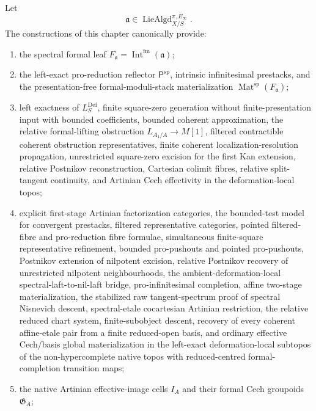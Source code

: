 \begin{theorem}
\label{thm:bnli-package}
Let
\[
    \mathfrak a
    \in
    \operatorname{LieAlgd}^{\pi,E_\infty}_{X/S}.
\]
The constructions of this chapter canonically provide:
\begin{enumerate}
    \item the spectral formal leaf
    $F_{\mathfrak a}=\operatorname{Int}^{\mathrm{fm}}(\mathfrak a)$;
    \item the left-exact pro-reduction reflector
    $\mathsf P^{\mathrm{sp}}$, intrinsic infinitesimal prestacks, and the
    presentation-free formal-moduli-stack materialization
    $\operatorname{Mat}^{\mathrm{sp}}(F_{\mathfrak a})$;
    \item left exactness of $L_S^{\mathrm{Def}}$, finite square-zero
    generation without finite-presentation input with bounded coefficients,
    bounded coherent approximation, the relative formal-lifting obstruction
    $L_{A_1/A}\to M[1]$, filtered contractible coherent obstruction
    representatives, finite coherent localization-resolution propagation, unrestricted square-zero
    excision for the first Kan extension, relative Postnikov reconstruction,
    Cartesian colimit fibres, relative split-tangent continuity, and Artinian
    Cech effectivity in the deformation-local topos;
    \item explicit first-stage Artinian factorization categories, the
    bounded-test model for convergent prestacks, filtered representative
    categories, pointed filtered-fibre and pro-reduction fibre formulae,
    simultaneous finite-square representative refinement, bounded
    pro-pushouts and pointed pro-pushouts, Postnikov extension of nilpotent
    excision, relative
    Postnikov recovery of unrestricted nilpotent neighbourhoods, the
    ambient-deformation-local spectral-laft-to-nil-laft bridge, pro-infinitesimal completion, affine
    two-stage materialization, the stabilized raw tangent-spectrum proof of
    spectral Nisnevich descent, spectral-etale cocartesian Artinian
    restriction, the relative reduced chart system, finite-subobject descent, recovery of every
    coherent affine-etale pair from a finite reduced-open basis, and ordinary
    effective Cech/basis global materialization in the left-exact deformation-local
    subtopos of the non-hypercomplete native topos with reduced-centred
    formal-completion transition maps;
    \item the native Artinian effective-image cells $I_A$ and their formal Cech
    groupoids $\mathfrak G_A$;

\end{enumerate}
\end{theorem}
